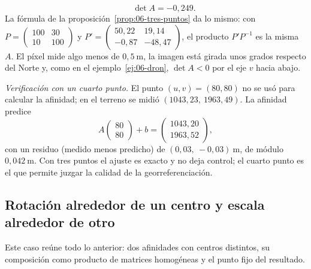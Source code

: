 \begin{ejemplo}
\[  \qquad
  \det A=-0{,}249 .
\]
La fórmula de la proposición~\ref{prop:06-tres-puntos} da lo mismo: con
\(P=\begin{pmatrix}100&30\\10&100\end{pmatrix}\) y
\(P'=\begin{pmatrix}50{,}22&19{,}14\\-0{,}87&-48{,}47\end{pmatrix}\), el producto \(P'P^{-1}\)
es la misma \(A\). El píxel mide algo menos de \(0{,}5\ \mathrm{m}\), la imagen está girada
unos grados respecto del Norte y, como en el ejemplo~\ref{ej:06-dron}, \(\det A<0\) por el
eje \(v\) hacia abajo.

\emph{Verificación con un cuarto punto.} El punto \((u,v)=(80,80)\) no se usó para calcular
la afinidad; en el terreno se midió \((1043{,}23,\ 1963{,}49)\). La afinidad predice
\[
  A\begin{pmatrix}80\\80\end{pmatrix}+b
  =\begin{pmatrix}1043{,}20\\1963{,}52\end{pmatrix},
\]
con un residuo (medido menos predicho) de \((0{,}03,\ -0{,}03)\ \mathrm{m}\), de módulo
\(0{,}042\ \mathrm{m}\). Con tres puntos el ajuste es exacto y no deja control; el cuarto
punto es el que permite juzgar la calidad de la georreferenciación.
\end{ejemplo}

\subsection{Rotación alrededor de un centro y escala alrededor de otro}\label{sec:06-rot-escala}

Este caso reúne todo lo anterior: dos afinidades con centros distintos, su composición como
producto de matrices homogéneas y el punto fijo del resultado.

